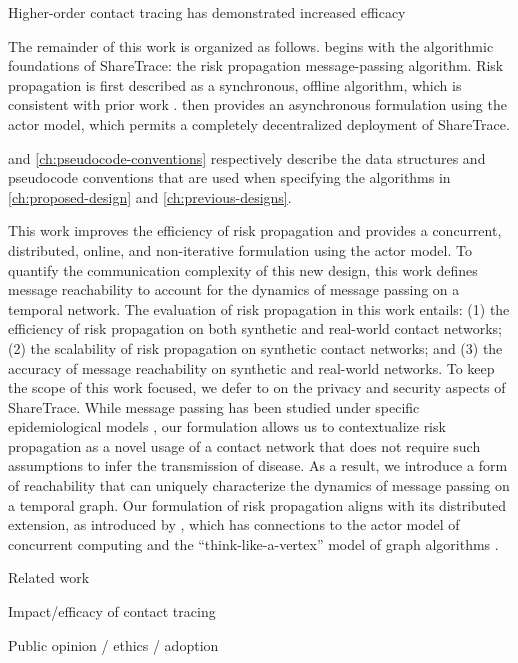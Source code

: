 
Higher-order contact tracing has demonstrated increased efficacy \citep{PozoMartin2023}




The remainder of this work is organized as follows.  begins with the algorithmic foundations of ShareTrace: the risk propagation message-passing algorithm. Risk propagation is first described as a synchronous, offline algorithm, which is consistent with prior work \citep{Ayday2020, Ayday2021}.  then provides an asynchronous formulation using the actor model, which permits a completely decentralized deployment of ShareTrace.

 and \cref{ch:pseudocode-conventions} respectively describe the data structures and pseudocode conventions that are used when specifying the algorithms in \cref{ch:proposed-design} and \cref{ch:previous-designs}.

This work improves the efficiency of risk propagation and provides a concurrent, distributed, online, and non-iterative formulation using the actor model. To quantify the communication complexity of this new design, this work defines message reachability to account for the dynamics of message passing on a temporal network. 
%
The evaluation of risk propagation in this work entails: (1) the efficiency of risk propagation on both synthetic and real-world contact networks; (2) the scalability of risk propagation on synthetic contact networks; and (3) the accuracy of message reachability on synthetic and real-world networks. To keep the scope of this work focused, we defer to \citep{Ayday2021} on the privacy and security aspects of ShareTrace.
%
While message passing has been studied under specific epidemiological models \citep{Karrer2010, Li2021}, our formulation allows us to contextualize risk propagation as a novel usage of a contact network that does not require such assumptions to infer the transmission of disease. As a result, we introduce a form of reachability that can uniquely characterize the dynamics of message passing on a temporal graph. Our formulation of risk propagation aligns with its distributed extension, as introduced by \citet{Ayday2021}, which has connections to the actor model of concurrent computing \citep{Baker1977, Agha1986} and the ``think-like-a-vertex'' model of graph algorithms \citep{McCune2015}.

Related work \citep{Reichert2020, Cho2020, Cherini2023, Gupta2023}

Impact/efficacy of contact tracing \citep{PozoMartin2023}

Public opinion / ethics / adoption \citep{Oyibo2022, Afroogh2022, Simko2022}